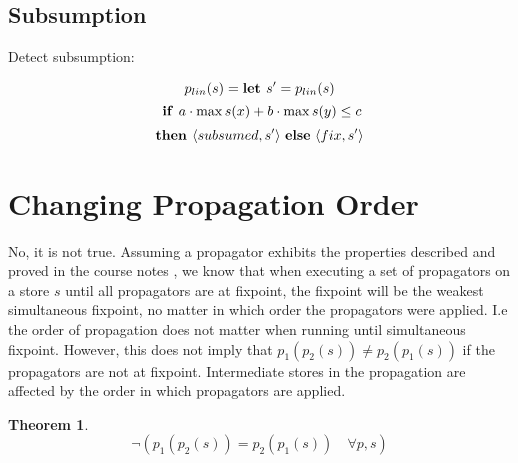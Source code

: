 \documentclass[a4paper, 11pt]{article}
\newtheorem{theorem}{Theorem}[section]
\begin{document}
\subsection*{Subsumption}
Detect subsumption:

$$p_{lin}(s) =  \text{\textbf{let }} s' = p_{lin}(s)$$
$$\text{ \textbf{if }} a \cdot \max s(x) + b \cdot \max s(y) \leq c$$
$$\text{\textbf{then }} \langle subsumed, s' \rangle \text{ \textbf{else} } \langle fix, s' \rangle$$


\section*{Changing Propagation Order}
No, it is not true. Assuming a propagator exhibits the properties described and proved in the course notes \citep{schulte_notes}, we know that when executing a set of propagators on a store $s$ until all propagators are at fixpoint, the fixpoint will be the weakest simultaneous fixpoint, no matter in which order the propagators were applied. I.e the order of propagation does not matter when running until simultaneous fixpoint. However, this does not imply that $p_1(p_2(s)) \neq p_2(p_1(s))$ if the propagators are not at fixpoint. Intermediate stores in the propagation are affected by the order in which propagators are applied.

\begin{theorem}
$$\neg(p_1(p_2(s)) = p_2(p_1(s)) \quad \forall p, s)$$
\end{theorem}
\end{document}
